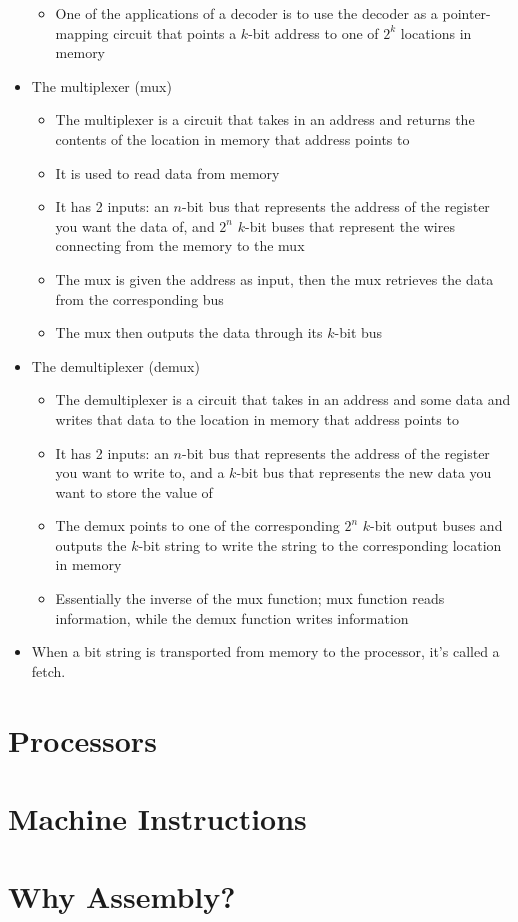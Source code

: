 \documentclass{article}
\begin{document}
\begin{itemize}
\begin{itemize}
			\item One of the applications of a decoder is to use the decoder as a pointer-mapping circuit that points a $k$-bit address to one of $2^k$ locations in memory
		\end{itemize}
	\item The multiplexer (mux)
		\begin{itemize}
			\item The multiplexer is a circuit that takes in an address and returns the contents of the location in memory that address points to
			\item It is used to read data from memory
			\item It has 2 inputs: an $n$-bit bus that represents the address of the register you want the data of, and $2^n$ $k$-bit buses that represent the wires connecting from the memory to the mux
			\item The mux is given the address as input, then the mux retrieves the data from the corresponding bus
			\item The mux then outputs the data through its $k$-bit bus
		\end{itemize}
	\item The demultiplexer (demux)
		\begin{itemize}
			\item The demultiplexer is a circuit that takes in an address and some data and writes that data to the location in memory that address points to
			\item It has 2 inputs: an $n$-bit bus that represents the address of the register you want to write to, and a $k$-bit bus that represents the new data you want to store the value of
			\item The demux points to one of the corresponding $2^n$ $k$-bit output buses and outputs the $k$-bit string to write the string to the corresponding location in memory
			\item Essentially the inverse of the mux function; mux function reads information, while the demux function writes information
		\end{itemize}
	\item When a bit string is transported from memory to the processor, it's called a fetch.
\end{itemize}

\section{Processors}

\section{Machine Instructions}

\section{Why Assembly?}
\end{document}
